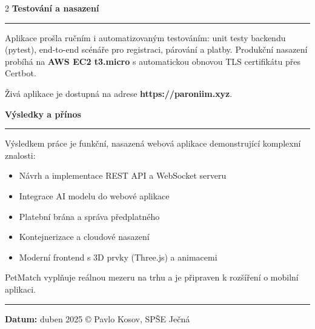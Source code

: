 \documentclass[final]{beamer}
\newcommand{\Heading}[1]{%
  \vspace{1em}%
  {\color{jecnaBlue}\bfseries\fontsize{56}{70}\selectfont #1}\par
  \noindent\textcolor{accentOrange}{\rule{\linewidth}{3pt}}\par
  \vspace{0.5em}%
}
\begin{document}
\begin{frame}[t]
\begin{multicols}{2}
\Heading{Testování a nasazení}

{\fontsize{32}{42}\selectfont
Aplikace prošla ručním i automatizovaným testováním: unit testy backendu (pytest), end-to-end scénáře pro registraci, párování a platby. Produkční nasazení probíhá na \textbf{AWS EC2 t3.micro} s automatickou obnovou TLS certifikátu přes Certbot.

Živá aplikace je dostupná na adrese \textbf{https://paroniim.xyz}.
}

\Heading{Výsledky a přínos}

{\fontsize{32}{42}\selectfont
Výsledkem práce je funkční, nasazená webová aplikace demonstrující komplexní znalosti:
\begin{itemize}
  \item Návrh a implementace REST API a WebSocket serveru
  \item Integrace AI modelu do webové aplikace
  \item Platební brána a správa předplatného
  \item Kontejnerizace a cloudové nasazení
  \item Moderní frontend s 3D prvky (Three.js) a animacemi
\end{itemize}

PetMatch vyplňuje reálnou mezeru na trhu a je připraven k rozšíření o mobilní aplikaci.
}

\end{multicols}

\vfill
\noindent\rule{\linewidth}{2pt}
\vspace{0.5em}
\begin{center}
  {\fontsize{30}{38}\selectfont
  \textbf{Datum:} duben 2025
  \quad\textbullet\quad © Pavlo Kosov, SPŠE Ječná \the\year
  }
\end{center}

\end{frame}
\end{document}
